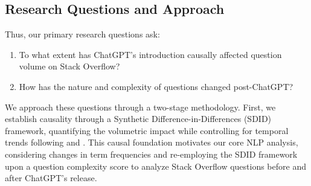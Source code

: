 
\subsection{Research Questions and Approach}
Thus, our primary research questions ask: 
\begin{enumerate}
    \item To what extent has ChatGPT's introduction causally affected question volume on Stack Overflow?
    \item How has the nature and complexity of questions changed post-ChatGPT?
\end{enumerate}

We approach these questions through a two-stage methodology. First, we establish causality through a Synthetic Difference-in-Differences (SDID) framework, quantifying the volumetric impact while controlling for temporal trends following \textcite{arkhangelsky_synthetic_2021} and \textcite{clarke_synthetic_2023}. This causal foundation motivates our core NLP analysis, considering changes in term frequencies and re-employing the SDID framework upon a question complexity score to analyze Stack Overflow questions before and after ChatGPT's release.

